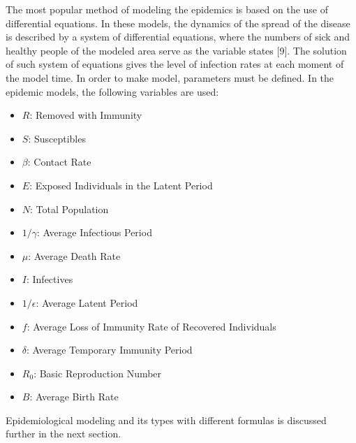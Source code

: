 The most popular method of modeling the epidemics is based on the use of differential equations. In these models, the dynamics of the spread of the disease is described by a system of differential equations, where the numbers of sick and healthy people of the modeled area serve as the variable states [9]. The solution of such system of equations gives the level of infection rates at each moment of the model time. In order to make model, parameters must be defined. In the epidemic models, the following variables are used:

\begin{itemize}
\item $R$: Removed with Immunity
\item $S$: Susceptibles
\item $\beta$: Contact Rate
\item $E$: Exposed Individuals in the Latent Period
\item $N$: Total Population
\item $1/\gamma$: Average Infectious Period
\item $\mu$: Average Death Rate
\item $I$: Infectives
\item $1/\epsilon$: Average Latent Period
\item $f$: Average Loss of Immunity Rate of Recovered Individuals
\item $\delta$: Average Temporary Immunity Period
\item $R_0$: Basic Reproduction Number
\item $B$: Average Birth Rate
\end{itemize}

Epidemiological modeling and its types with different formulas is discussed further in the next section.
